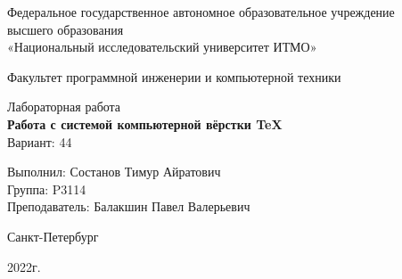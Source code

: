 \begin{center}
	{\large
	Федеральное государственное автономное образовательное учреждение\\
	высшего образования\\
	«Национальный исследовательский университет ИТМО»
	
	\vspace{5pt}
	Факультет программной инженерии и компьютерной техники
	}
	\vspace{17em}
	
	{\Large Лабораторная работа }\\
	\smallskip
	{\LARGE \textbf{Работа с системой компьютерной вёрстки \TeX}}\\[1em]
	{\large Вариант: 44}
	

\end{center}

\vspace{20em}
{\large
\begin{flushright}
	Выполнил: Состанов Тимур Айратович\\
	Группа: P3114\\
	Преподаватель: Балакшин Павел Валерьевич\
\end{flushright}

\vspace{\fill}

\begin{center}
	Санкт-Петербург
	
	2022г.
\end{center}
}